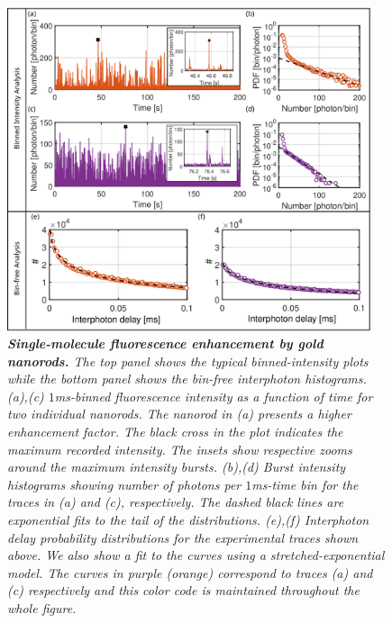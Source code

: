 \begin{figure}
\includegraphics[width=0.95\textwidth]{05_Figure_5_enhancement_traces}%
\caption{\textit{\textbf{Single-molecule fluorescence enhancement by gold nanorods.} 
The top panel shows the typical binned-intensity plots while the bottom 
panel shows the bin-free interphoton histograms.
(a),(c) $1$ms-binned fluorescence intensity as a function 
of time for two individual nanorods. The nanorod in (a) presents
a higher enhancement factor. The black cross in the plot indicates the 
maximum recorded intensity. The insets show respective zooms around the maximum
intensity bursts.
(b),(d) Burst intensity histograms showing number of photons per $1$ms-time bin for the traces in (a) and (c), 
respectively. The dashed black lines are exponential fits to the tail of the distributions. 
(e),(f) Interphoton delay probability distributions for the experimental traces 
shown above. We also show a fit to the curves using a stretched-exponential model.
The curves in purple (orange) correspond to traces (a) and (c) respectively and this color code is maintained throughout the whole figure. 
\label{fg:GNRS}}}
\end{figure}

